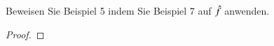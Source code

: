 
\begin{exercise}
  Beweisen Sie Beispiel 5 indem Sie Beispiel 7 auf $\hat{f}$ anwenden.
\end{exercise}

\begin{proof}

\end{proof}
